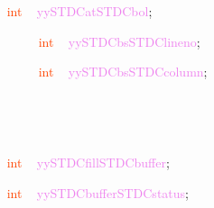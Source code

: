 \documentclass[8, usernames, dvipsnames]{beamer}
\begin{document}
\begin{frame}
\textcolor{White}{\   }
\textcolor{OrangeRed}{int}
\textcolor{White}{\ }
\textcolor{Violet}{yySTDCatSTDCbol}\textcolor{Sepia}{;}

 
 \textcolor{White}{\ }
\textcolor{White}{\ }
\textcolor{White}{\ }
\textcolor{White}{\ }
\textcolor{OrangeRed}{int}
\textcolor{White}{\ }
\textcolor{Violet}{yySTDCbsSTDClineno}\textcolor{Sepia}{;}
\textcolor{White}{\ }

 \textcolor{White}{\ }
\textcolor{White}{\ }
\textcolor{White}{\ }
\textcolor{White}{\ }
\textcolor{OrangeRed}{int}
\textcolor{White}{\ }
\textcolor{Violet}{yySTDCbsSTDCcolumn}\textcolor{Sepia}{;}
\textcolor{White}{\ }

 \textcolor{White}{\ }
\textcolor{White}{\ }
\textcolor{White}{\ }
\textcolor{White}{\ }

 \textcolor{White}{\   }

 \textcolor{White}{\   }
\textcolor{OrangeRed}{int}
\textcolor{White}{\ }
\textcolor{Violet}{yySTDCfillSTDCbuffer}\textcolor{Sepia}{;}

 
 \textcolor{White}{\   }
\textcolor{OrangeRed}{int}
\textcolor{White}{\ }
\textcolor{Violet}{yySTDCbufferSTDCstatus}\textcolor{Sepia}{;}

 
 \end{frame}
\end{document}
